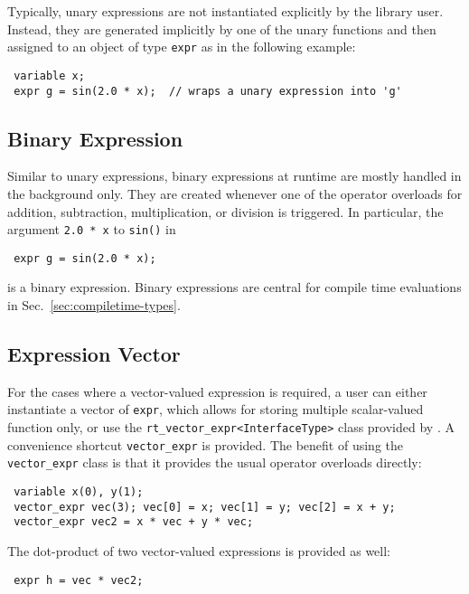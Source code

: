 
Typically, unary expressions are not instantiated explicitly by the library user.
Instead, they are generated implicitly by one of the unary functions and then assigned to an object of type \lstinline|expr| as in the following example:
\begin{lstlisting}
 variable x;
 expr g = sin(2.0 * x);  // wraps a unary expression into 'g'
\end{lstlisting}

 \subsection{Binary Expression}
Similar to unary expressions, binary expressions at runtime are mostly handled in the background only.
They are created whenever one of the operator overloads for addition, subtraction, multiplication, or division is triggered.
In particular, the argument \lstinline|2.0 * x| to \lstinline|sin()| in
\begin{lstlisting}
 expr g = sin(2.0 * x);
\end{lstlisting}
is a binary expression. Binary expressions are central for compile time evaluations in Sec.~\ref{sec:compiletime-types}.

 \subsection{Expression Vector}
For the cases where a vector-valued expression is required, a user can either instantiate a vector of \lstinline|expr|, which allows for storing multiple scalar-valued function only,
or use the \lstinline|rt_vector_expr<InterfaceType>| class provided by {\ViennaMath}. A convenience shortcut \lstinline|vector_expr| is provided.
The benefit of using the \lstinline|vector_expr| class is that it provides the usual operator overloads directly:
\begin{lstlisting}
 variable x(0), y(1);
 vector_expr vec(3); vec[0] = x; vec[1] = y; vec[2] = x + y;
 vector_expr vec2 = x * vec + y * vec;
\end{lstlisting}
The dot-product of two vector-valued expressions is provided as well:
\begin{lstlisting}
 expr h = vec * vec2;
\end{lstlisting}



